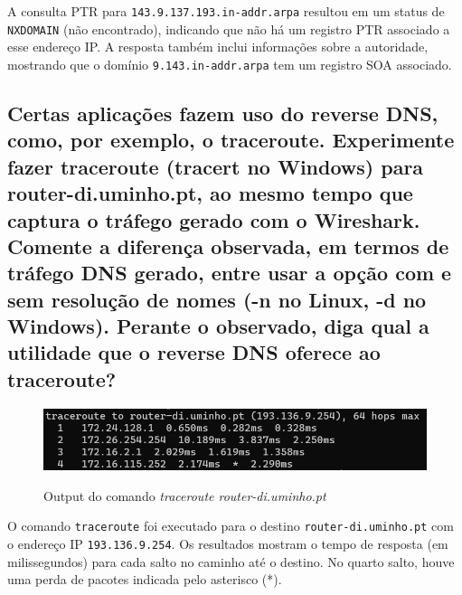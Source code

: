 A consulta PTR para \texttt{143.9.137.193.in-addr.arpa} resultou em 
um status de \texttt{NXDOMAIN} (não encontrado), indicando que não há 
um registro PTR associado a esse endereço IP. A resposta também 
inclui informações sobre a autoridade, mostrando que o domínio 
\texttt{9.143.in-addr.arpa} tem um registro SOA associado.


\subsection{Certas aplicações fazem uso do reverse DNS, como, por exemplo, o traceroute. Experimente fazer
traceroute (tracert no Windows) para router-di.uminho.pt, ao mesmo tempo que captura o tráfego gerado
com o Wireshark. Comente a diferença observada, em termos de tráfego DNS gerado, entre usar a opção
com e sem resolução de nomes (-n no Linux, -d no Windows). Perante o observado, diga qual a utilidade
que o reverse DNS oferece ao traceroute?}

\begin{figure} [h!]
    \centering
    \includegraphics[width=1\textwidth]{images/ex3.traceroute.png}
    \caption{\label{fig:comando4}}Output do comando \textit{traceroute router-di.uminho.pt}
\end{figure}

O comando \texttt{traceroute} foi executado para o destino 
\texttt{router-di.uminho.pt} com o endereço IP \texttt{193.136.9.254}. 
Os resultados mostram o tempo de resposta (em milissegundos) para cada 
salto no caminho até o destino. No quarto salto, houve uma perda de 
pacotes indicada pelo asterisco (*).

